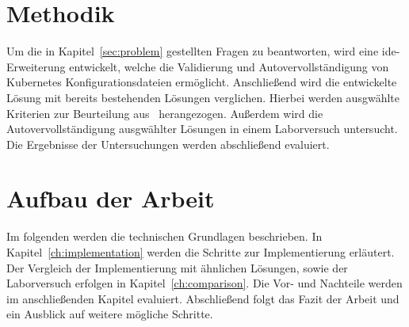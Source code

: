 \section{Methodik}
Um die in Kapitel~\ref{sec:problem} gestellten Fragen zu beantworten, wird eine \acs{ide}-Erweiterung entwickelt, welche die Validierung und Autovervollständigung von
Kubernetes Konfigurationsdateien ermöglicht. Anschließend wird die entwickelte Lösung mit bereits bestehenden Lösungen verglichen.
Hierbei werden ausgwählte Kriterien zur Beurteilung aus~\cite[A Large-Scale Study of Usability Criteria Addressed by Static Analysis Tools]{usability-criteria-static-analysis-tools} herangezogen.
Außerdem wird die Autovervollständigung ausgwählter Lösungen in einem Laborversuch untersucht.
Die Ergebnisse der Untersuchungen werden abschließend evaluiert.

\section{Aufbau der Arbeit}
Im folgenden werden die technischen Grundlagen beschrieben. In Kapitel~\ref{ch:implementation} werden die Schritte zur Implementierung erläutert.
Der Vergleich der Implementierung mit ähnlichen Lösungen, sowie der Laborversuch erfolgen in Kapitel~\ref{ch:comparison}.
Die Vor- und Nachteile werden im anschließenden Kapitel evaluiert. Abschließend folgt das Fazit der Arbeit und ein Ausblick auf weitere mögliche Schritte.